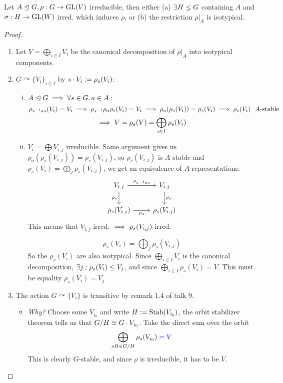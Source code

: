 \documentclass[a4paper]{article}
\begin{document}
\begin{prop}[Prop 24]
  Let $A \trianglelefteq G, \rho: G \to \operatorname{GL}(V)$ irreducible, then either (a) $\exists H \lneq G$ containing $A$ and $\sigma : H \to \operatorname{GL}(W)$ irred. which induces $\rho$, or (b) the restriction $\rho|_{A}$ is isotypical.
  \begin{proof}\item
    \begin{enumerate}[(1)]
      \item Let $V = \bigoplus_{i \in I} V_{i}$ be the canonical decomposition of $\rho|_{A}$ into isotypical components.
      \item $G \curvearrowright \{V_{i}\}_{i \in I}$ by $s \cdot V_{i} := \rho_{s}(V_{i})$:
            \begin{enumerate}[(i)]
              \item $A \trianglelefteq G \implies \forall s \in G, a \in A:$
                    \[\rho_{s^{-1}as}(V_{i}) = V_{i} \imp \rho_{s^{-1}}\rho_{a}\rho_{s}(V_{i}) = V_{i} \imp \rho_{a}(\rho_{s}(V_{i})) = \rho_{s}(V_{i}) \imp \rho_{s}(V_{i}) \ \ A\text{-stable}\]
                    \[\implies V = \rho_{s}(V) = \bigoplus_{i \in I}\rho_{s}(V_{i})\]
              \item $V_{i} = \bigoplus V_{i,j}$ irreducible. Same argument gives us $\rho_{a}(\rho_{s}(V_{i,j})) = \rho_{s}(V_{i,j})$, so $\rho_{s}(V_{i,j})$ is $A$-stable and $\rho_{s}(V_{i}) = \bigoplus_{j} \rho_{s}(V_{i,j})$, we get an equivalence of $A$-representations:
                      \[\begin{tikzcd}
{V_{i,j}} \arrow[d, "\rho_s"'] \arrow[r, "\rho_{s^{-1}as}"] & {V_{i,j}} \arrow[d, "\rho_s"] \\
{\rho_s(V_{i,j})} \arrow[r, "\rho_a"']                      & {\rho_s(V_{i,j})}
\end{tikzcd}\]
                    This means that $V_{i,j}$ irred. $\implies \rho_{s}(V_{i,j})$ irred.

                    \[\rho_{s}(V_{i}) = \bigoplus_{j} \rho_{s}(V_{i,j})\]
                    So the $\rho_{s}(V_{i})$ are also isotypical. Since $\bigoplus_{i \in I}V_{i}$ is the canonical decomposition, $\exists j: \rho_{s}(V_{i}) \le V_{j}$, and since $\bigoplus_{i \in I}\rho_{s}(V_{i}) = V$. This must be equality $\rho_{s}(V_{i})=V_{j}$
            \end{enumerate}
      \item The action $G \curvearrowright \{V_{i}\}$ is transitive by remark 1.4 of talk 9.
            \begin{itemize}
      \item \emph{Why?} Choose some $V_{i_{0}}$ and write $H:= \operatorname{Stab}(V_{i_{0}})$, the orbit stabilizer theorem tells us that $G/H \simeq G\cdot V_{i_{0}}$. Take the direct sum over the orbit
            \[\bigoplus_{sH \in G/H}\rho_{s}(V_{i_{0}}) \color{blue} = V\]
            This is clearly $G$-stable, and since $\rho$ is irreducible, \color{blue}it has to be $V$.\color{black}


\end{itemize}
\end{enumerate}
\end{proof}
\end{prop}
\end{document}
